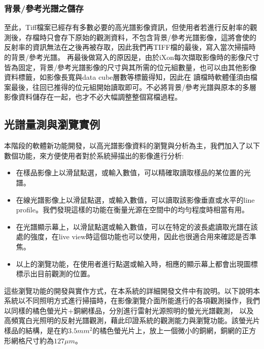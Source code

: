 \documentclass[12pt]{article}
\begin{document}
\subsubsection{背景/參考光譜之儲存}
至此，Tiff檔案已經存有多數必要的高光譜影像資訊，但使用者若進行反射率的觀測後，存檔時只會存下原始的觀測資料，不包含背景/參考光譜影像，這將會使的反射率的資訊無法在之後再被存取，因此我們再TIFF檔的最後，寫入當次掃描時的背景/參考光譜。
再最後做寫入的原因是，由於iXon每次擷取影像時的影像尺寸皆為固定，背景/參考光譜影像的尺寸與其所需的位元組數量，也可以由其他影像資料標籤，如影像長寬與data cube層數等標籤得知，因此在
讀檔時軟體僅須由檔案最後，往回已推得的位元組開始讀取即可。不必將背景/參考光譜與原本的多層影像資料儲存在一起，也才不必大幅調整整個寫檔過程。

\subsection{光譜量測與瀏覽實例}
本階段的軟體新功能開發，以高光譜影像資料的瀏覽與分析為主，我們加入了以下數個功能，來方便使用者對於系統掃描出的影像進行分析:
\begin{itemize}
    \item 在樣品影像上以滑鼠點選，或輸入數值，可以精確取讀取樣品的某位置的光譜。
    \item 在線光譜影像上以滑鼠點選，或輸入數值，可以讀取該影像垂直或水平的line profile。我們發現這樣的功能在衡量光源在空間中的均勻程度時相當有用。
    \item 在光譜顯示幕上，以滑鼠點選或輸入數值，可以在特定的波長處讀取光譜在該處的強度，在live view時這個功能也可以使用，因此也很適合用來確認是否準焦。
    \item 以上的瀏覽功能，在使用者進行點選或輸入時，相應的顯示幕上都會出現圖標標示出目前觀測的位置。
\end{itemize}
這些瀏覽功能的開發與實作方式，在本系統的詳細開發文件中有說明。\cite{sysDoc}以下說明本系統以不同照明方式進行掃描時，在影像瀏覽介面所能進行的各項觀測操作，我們以同樣的橘色螢光片+銅網樣品，分別進行雷射光源照明的螢光光譜觀測，
以及高頻寬白光照明的反射光譜觀測，藉此印證系統的觀測能力與瀏覽功能。該螢光片樣品的結構，是在約$3.5mm^2$的橘色螢光片上，放上一個微小的銅網，銅網的正方形網格尺寸約為$127\mu m$。
\end{document}
